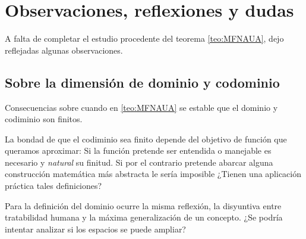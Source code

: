 %

\section{Observaciones, reflexiones y dudas} 

A falta de completar el estudio procedente del teorema \ref{teo:MFNAUA}, 
dejo reflejadas algunas observaciones. 

\subsection{Sobre la dimensión de dominio y codominio} 

Consecuencias sobre cuando en \ref{teo:MFNAUA} se estable que el dominio y codiminio son finitos. 

La bondad de que el codiminio sea finito depende del objetivo de función que queramos aproximar: 
Si la función pretende ser entendida o manejable es necesario y \textit{natural} su finitud. 
Si por el contrario pretende abarcar alguna 
construcción matemática más abstracta le sería imposible ¿Tienen una aplicación práctica tales definiciones?

Para la definición del dominio ocurre la misma reflexión, la disyuntiva entre tratabilidad humana y la máxima generalización de un concepto. 
¿Se podría intentar analizar si los espacios se puede ampliar?  

